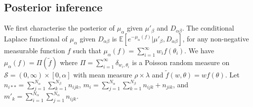 \documentclass{article}
\newtheorem{theorem}{Theorem}[section]
\begin{document}
%

\subsection{Posterior inference}
We first characterise the posterior of $\mu_\alpha$ given $\mu'_\beta$ and $D_{\alpha\beta}$. The conditional Laplace functional of $\mu_\alpha$ given $D_{\alpha\beta}$ is $\mathbb{E}[e^{-\mu_\alpha(f)}|\mu'_\beta, D_{\alpha\beta}]$, for any non-negative measurable function $f$ such that $\mu_\alpha(f) = \sum_{i=1}^{\infty}w_i f(\theta_i)$. We have $\mu_\alpha(f) = \Pi(\tilde{f})$ where $\Pi = \sum_{i=1}^{\infty} \delta_{w_i, \theta_i}$ is a Poisson random measure on $\mathcal{S} = (0, \infty) \times [0, \alpha]$ with mean measure $\rho \times \lambda$ and $\tilde{f}(w, \theta) = wf(\theta)$. Let $n_{i**} = \sum_{j=1}^{N_\alpha}\sum_{k=1}^{N_\beta}n_{ijk}$, $m_i = \sum_{j=1}^{N_\alpha}\sum_{k=1}^{N_\beta} n_{ijk} + n_{jik}$, and $m'_k = \sum_{i=1}^{N_\alpha} \sum_{j=1}^{N_\alpha} n_{ijk}$.
\end{document}
